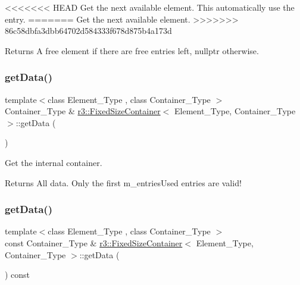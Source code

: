<<<<<<< HEAD
Get the next available element. This automatically use the entry. 
=======
Get the next available element. 
>>>>>>> 86c58dbfa3dbb64702d584333f678d875b4a173d

\begin{DoxyReturn}{Returns}
A free element if there are free entries left, nullptr otherwise. 
\end{DoxyReturn}
\mbox{\label{classr3_1_1_fixed_size_container_adbf383734c597677d4221278000886a3}} 
\subsubsection{\texorpdfstring{get\+Data()}{getData()}\hspace{0.1cm}{\footnotesize\ttfamily [1/2]}}
{\footnotesize\ttfamily template$<$class Element\+\_\+\+Type , class Container\+\_\+\+Type $>$ \\
Container\+\_\+\+Type \& \mbox{\hyperlink{classr3_1_1_fixed_size_container}{r3\+::\+Fixed\+Size\+Container}}$<$ Element\+\_\+\+Type, Container\+\_\+\+Type $>$\+::get\+Data (\begin{DoxyParamCaption}{ }\end{DoxyParamCaption})}



Get the internal container. 

\begin{DoxyReturn}{Returns}
All data. Only the first m\+\_\+entries\+Used entries are valid! 
\end{DoxyReturn}
\mbox{\label{classr3_1_1_fixed_size_container_acd837bc4730c98aa4346819726620842}} 
\subsubsection{\texorpdfstring{get\+Data()}{getData()}\hspace{0.1cm}{\footnotesize\ttfamily [2/2]}}
{\footnotesize\ttfamily template$<$class Element\+\_\+\+Type , class Container\+\_\+\+Type $>$ \\
const Container\+\_\+\+Type \& \mbox{\hyperlink{classr3_1_1_fixed_size_container}{r3\+::\+Fixed\+Size\+Container}}$<$ Element\+\_\+\+Type, Container\+\_\+\+Type $>$\+::get\+Data (\begin{DoxyParamCaption}{ }\end{DoxyParamCaption}) const}



